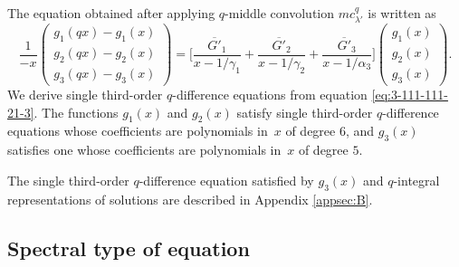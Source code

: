 \documentclass[pdftex]{sigma}
\numberwithin{equation}{section}
\theoremstyle{definition}
\begin{document}
The equation obtained after applying $q$-middle convolution $mc^q_{\lambda'}$ is written as
\begin{equation} \label{eq:3-111-111-21-3}
\frac{1}{-x}
\begin{pmatrix}
 g_1(qx) - g_1(x) \\
 g_2(qx) - g_2(x) \\
 g_3(qx) - g_3(x)
\end{pmatrix}
= \bigg[ \frac{\overline{G'}_1}{x-1/\gamma_1} + \frac{\overline{G'}_2}{x-1/\gamma_2} + \frac{\overline{G'}_3}{x-1/\alpha_3} \bigg]
 \begin{pmatrix}
 g_1(x) \\
 g_2(x) \\
 g_3(x)
 \end{pmatrix}.
\end{equation}
We derive single third-order $q$-difference equations from equation \eqref{eq:3-111-111-21-3}.
The functions $g_1(x)$ and $g_2(x)$ satisfy single third-order $q$-difference equations whose coefficients are polynomials in~$x$ of degree $6$, and $g_3(x)$ satisfies one whose coefficients are polynomials in~$x$ of degree $5$.

The single third-order $q$-difference equation satisfied by $g_3(x)$ and $q$-integral representations of solutions are described in Appendix \ref{appsec:B}.

\subsection{Spectral type of equation}\label{subsec:specttype}
\end{document}
